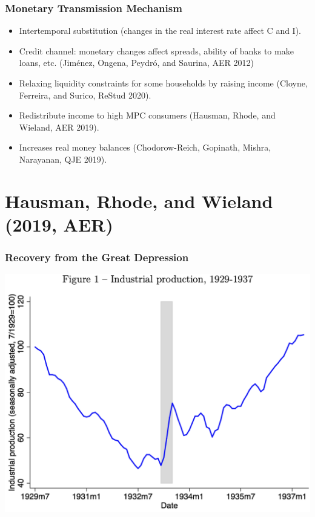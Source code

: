 \documentclass[english,xcolor=svgnames]{beamer}
\begin{document}
\begin{frame}
\frametitle[alignment=center]{Monetary Transmission Mechanism}
\begin{itemize}
	\item Intertemporal substitution (changes in the real interest rate affect C and I).
	\item Credit channel: monetary changes affect spreads, ability of banks to make loans, etc. (Jim\'{e}nez, Ongena, Peydr\'{o}, and Saurina, AER 2012)
	\item Relaxing liquidity constraints for some households by raising income (Cloyne, Ferreira, and Surico, ReStud 2020).
	\item Redistribute income to high MPC consumers (Hausman, Rhode, and Wieland, AER 2019).
	\item Increases real money balances (Chodorow-Reich, Gopinath, Mishra, Narayanan, QJE 2019).
\end{itemize}
\end{frame}


\section{Hausman, Rhode, and Wieland (2019, AER)}

\begin{frame}
\frametitle[alignment=center]{Recovery from the Great Depression}
\centering
\includegraphics[scale=0.5]{figures/HRWFIG1.png}
\end{frame}
\end{document}
